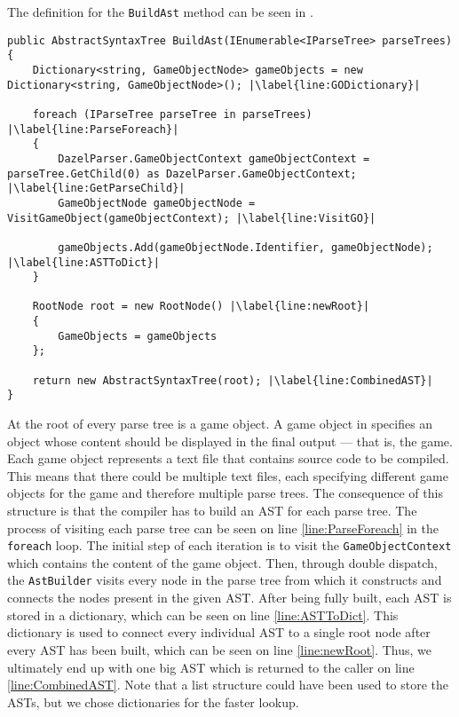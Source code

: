 The definition for the \texttt{BuildAst} method can be seen in .

\begin{lstlisting}[language=CSharp, caption={The \texttt{BuildAst} method.}, label={lst:BuildAstMethod},escapechar=|]
public AbstractSyntaxTree BuildAst(IEnumerable<IParseTree> parseTrees)
{
    Dictionary<string, GameObjectNode> gameObjects = new Dictionary<string, GameObjectNode>(); |\label{line:GODictionary}|
    
    foreach (IParseTree parseTree in parseTrees) |\label{line:ParseForeach}|
    {
        DazelParser.GameObjectContext gameObjectContext = parseTree.GetChild(0) as DazelParser.GameObjectContext; |\label{line:GetParseChild}|
        GameObjectNode gameObjectNode = VisitGameObject(gameObjectContext); |\label{line:VisitGO}|
        
        gameObjects.Add(gameObjectNode.Identifier, gameObjectNode); |\label{line:ASTToDict}|
    }

    RootNode root = new RootNode() |\label{line:newRoot}|
    {
        GameObjects = gameObjects
    };
    
    return new AbstractSyntaxTree(root); |\label{line:CombinedAST}|
}
\end{lstlisting}

At the root of every parse tree is a game object. A game object in \dazel{} specifies an object whose content should be displayed in the final output — that is, the game. Each game object represents a text file that contains source code to be compiled. This means that there could be multiple text files, each specifying different game objects for the game and therefore multiple parse trees. 
The consequence of this structure is that the compiler has to build an AST for each parse tree. The process of visiting each parse tree can be seen on line \ref{line:ParseForeach} in the \texttt{foreach} loop. 
The initial step of each iteration is to visit the \texttt{GameObjectContext} which contains the content of the game object.
Then, through double dispatch, the \texttt{AstBuilder} visits every node in the parse tree from which it constructs and connects the nodes present in the given AST.
After being fully built, each AST is stored in a dictionary, which can be seen on line \ref{line:ASTToDict}. 
This dictionary is used to connect every individual AST to a single root node after every AST has been built, which can be seen on line \ref{line:newRoot}. Thus, we ultimately end up with one big AST which is returned to the caller on line \ref{line:CombinedAST}. Note that a list structure could have been used to store the ASTs, but we chose dictionaries for the faster lookup.
 
